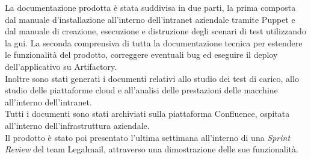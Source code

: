 La documentazione prodotta è stata suddivisa in due parti, la prima composta dal manuale d'installazione all'interno dell'\gls{intranet} aziendale tramite Puppet e dal manuale di creazione, esecuzione e distruzione degli scenari di test utilizzando la \gls{gui}. La seconda comprensiva di tutta la documentazione tecnica per estendere le funzionalità del prodotto, correggere eventuali bug ed eseguire il \gls{deploy} dell'applicativo su Artifactory.\\
Inoltre sono stati generati i documenti relativi allo studio dei test di carico, allo studio delle piattaforme \gls{cloud} e all'analisi delle prestazioni delle macchine all'interno dell'\gls{intranet}.\\
Tutti i documenti sono stati archiviati sulla piattaforma Confluence, ospitata all'interno dell'infrastruttura aziendale.\\
Il prodotto è stato poi presentato l'ultima settimana all'interno di una \textit{Sprint Review} del team Legalmail, attraverso una dimostrazione delle sue funzionalità.